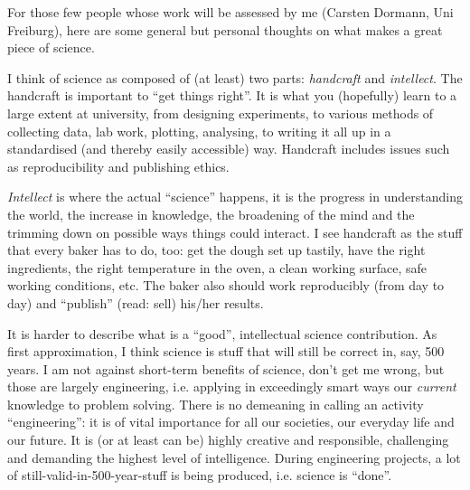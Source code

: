 \bigskip
\noindent For those few people whose work will be assessed by me (Carsten Dormann, Uni Freiburg), here are some general but personal thoughts on what makes a great piece of science.

I think of science as composed of (at least) two parts: \emph{handcraft} and \emph{intellect}. The handcraft is important to ``get things right''. It is what you (hopefully) learn to a large extent at university, from designing experiments, to various methods of collecting data, lab work, plotting, analysing, to writing it all up in a standardised (and thereby easily accessible) way. Handcraft includes issues such as reproducibility and publishing ethics.

\emph{Intellect} is where the actual ``science'' happens, it is the progress in understanding the world, the increase in knowledge, the broadening of the mind and the trimming down on possible ways things could interact. I see handcraft as the stuff that every baker has to do, too: get the dough set up tastily, have the right ingredients, the right temperature in the oven, a clean working surface, safe working conditions, etc. The baker also should work reproducibly (from day to day) and ``publish'' (read: sell) his/her results.

It is harder to describe what is a ``good'', intellectual science contribution. As first approximation, I think science is stuff that will still be correct in, say, 500 years. I am not against short-term benefits of science, don't get me wrong, but those are largely engineering, i.e. applying in exceedingly smart ways our \emph{current} knowledge to problem solving. There is no demeaning in calling an activity ``engineering'': it is of vital importance for all our societies, our everyday life and our future. It is (or at least can be) highly creative and responsible, challenging and demanding the highest level of intelligence. During engineering projects, a lot of still-valid-in-500-year-stuff is being produced, i.e. science is ``done''. 

